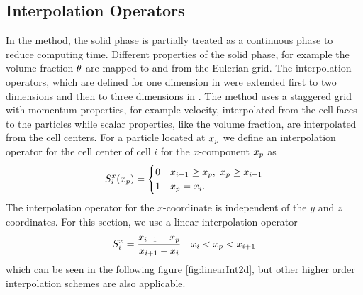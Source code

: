 \subsection{Interpolation Operators}
In the \MP method, the solid phase is partially treated as a continuous phase to reduce computing time.
Different properties of the solid phase, for example the volume fraction $\theta$ are mapped to and from the Eulerian grid.
The interpolation operators, which are defined for one dimension in \cite{MPPICFirst} were extended first to two dimensions \cite{MP2d} and then to three dimensions in \cite{MPInterpolation}.
The \MP method uses a staggered grid with momentum properties, for example velocity, interpolated from the cell faces to the particles while scalar properties, like the volume fraction, are interpolated from the cell centers.
For a particle located at $x_p$ we define an interpolation operator for the cell center of cell $i$ for the $x$-component $x_p$ as
\begin{equation}
    S_i^{x} (x_p) = \begin{cases}
        0 & x_{i-1} \geq x_p, \ x_p \geq x_{i+1} \\
        1 & x_p = x_{i}.
    \end{cases}
\end{equation}
The interpolation operator for the $x$-coordinate is independent of the $y$ and $z$ coordinates.
For this section, we use a linear interpolation operator
\begin{equation}
\label{eq:LinIntOp}
    S_{i}^{x} = \dfrac{x_{i+1}- x_p}{x_{i+1} - x_i} \quad x_{i} < x_p < x_{i+1}
\end{equation}
which can be seen in the following figure \ref{fig:linearInt2d}, but other higher order interpolation schemes are also applicable.
